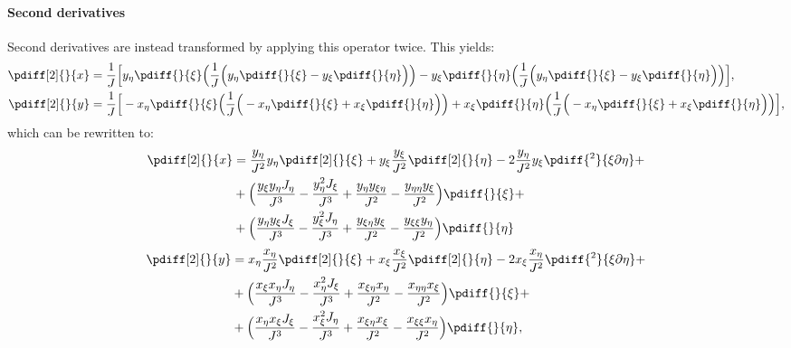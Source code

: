 \paragraph*{Second derivatives}
Second derivatives are instead transformed by applying this operator twice.
This yields:
%
\begin{align}
	\pdiff[2]{}{x}
	&=\frac{1}{J}\Big[y_{\eta} \pdiff{}{\xi} \Big( \frac{1}{J}\Big(y_{\eta} \pdiff{}{\xi}
	-y_{\xi}\pdiff{}{\eta}\Big)\Big)
	-y_{\xi}\pdiff{}{\eta} \Big( \frac{1}{J}\Big(y_{\eta} \pdiff{}{\xi}
	-y_{\xi}\pdiff{}{\eta}\Big) \Big) \Big],
\\
\pdiff[2]{}{y}
		&=\frac{1}{J}\Big[-x_{\eta}\pdiff{}{\xi} \Big( \frac{1}{J}\Big(-x_{\eta}\pdiff{}{\xi}
		+x_{\xi}\pdiff{}{\eta}
		\Big)\Big)
		+x_{\xi}\pdiff{}{\eta} \Big(\frac{1}{J}\Big(-x_{\eta}\pdiff{}{\xi}
		+x_{\xi}\pdiff{}{\eta}
		\Big) \Big)
		\Big],
\end{align}
%
which can be rewritten to:
%
\begin{align}
	\begin{aligned}
		\pdiff[2]{}{x} & =
		\frac{y_{\eta}}{J^2} y_{\eta} \pdiff[2]{}{\xi}
		+ y_{\xi} \frac{y_{\xi}}{J^2} \pdiff[2]{}{\eta}
		- 2\frac{y_{\eta}}{J^2} y_{\xi}\pdiff{^2}{\xi \partial \eta} + \\
		& +  \Big(
		\frac{y_{\xi} y_{\eta}J_{\eta}}{J^3}
		- \frac{y_{\eta}^2 J_{\xi}}{J^3}
		+ \frac{y_{\eta}y_{\xi\eta}}{J^2}
		-  \frac{y_{\eta \eta} y_{\xi}}{J^2}
		\Big)\pdiff{}{\xi} +\\
		& + \Big(
		\frac{y_{\eta} y_{\xi} J_{\xi}}{J^3}
		- \frac{y_{\xi}^2 J_{\eta}}{J^3}
		+  \frac{y_{\xi \eta}y_{\xi}}{J^2}
		- \frac{ y_{\xi\xi} y_{\eta}}{J^2}
		\Big)\pdiff{}{\eta}
	\end{aligned}
\end{align}
\begin{align}
    \begin{aligned}
		\pdiff[2]{}{y} & =
	    x_{\eta}\frac{x_{\eta}}{J^2}\pdiff[2]{}{\xi}
		+ x_{\xi}\frac{x_{\xi}}{J^2}\pdiff[2]{}{\eta}
		- 2 x_{\xi}\frac{x_{\eta}}{J^2}\pdiff{^2}{\xi \partial\eta} + \\
		& + \Big(
		\frac{x_{\xi}x_{\eta}J_{\eta}}{J^3}
		-\frac{x_{\eta}^2J_{\xi}}{J^3}
		+ \frac{x_{\xi\eta} x_{\eta}}{J^2}
		- \frac{x_{\eta\eta}x_{\xi}}{J^2}
		\Big) \pdiff{}{\xi} + \\
		&+ \Big(
		\frac{x_{\eta}x_{\xi}J_{\xi}}{J^3}
		- \frac{ x_{\xi}^2J_{\eta}}{J^3}
		+ \frac{x_{\xi\eta}x_{\xi}}{J^2}
		- \frac{x_{\xi \xi}x_{\eta}}{J^2}
		\Big) \pdiff{}{\eta},
    \end{aligned}
\end{align}

